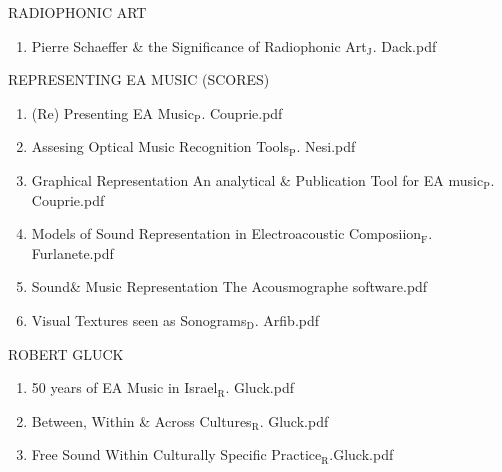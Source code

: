 \documentclass[11pt]{article}
\begin{document}
\item RADIOPHONIC ART
\label{sec-1-1-1-1-49-1-28}
\begin{enumerate}
\item Pierre Schaeffer \& the Significance of Radiophonic Art$_{\text{J}}$. Dack.pdf
\label{sec-1-1-1-1-49-1-28-1}
\end{enumerate}

\item REPRESENTING EA MUSIC (SCORES)
\label{sec-1-1-1-1-49-1-29}
\begin{enumerate}
\item (Re) Presenting EA Music$_{\text{P}}$. Couprie.pdf
\label{sec-1-1-1-1-49-1-29-1}

\item Assesing Optical Music Recognition Tools$_{\text{P}}$. Nesi.pdf
\label{sec-1-1-1-1-49-1-29-2}

\item Graphical Representation An analytical \& Publication Tool for EA music$_{\text{P}}$. Couprie.pdf
\label{sec-1-1-1-1-49-1-29-3}

\item Models of Sound Representation in Electroacoustic Composiion$_{\text{F}}$. Furlanete.pdf
\label{sec-1-1-1-1-49-1-29-4}

\item Sound\& Music Representation The Acousmographe software.pdf
\label{sec-1-1-1-1-49-1-29-5}

\item Visual Textures seen as Sonograms$_{\text{D}}$. Arfib.pdf
\label{sec-1-1-1-1-49-1-29-6}
\end{enumerate}

\item ROBERT GLUCK
\label{sec-1-1-1-1-49-1-30}
\begin{enumerate}
\item 50 years of EA Music in Israel$_{\text{R}}$. Gluck.pdf
\label{sec-1-1-1-1-49-1-30-1}

\item Between, Within \& Across Cultures$_{\text{R}}$. Gluck.pdf
\label{sec-1-1-1-1-49-1-30-2}

\item Free Sound Within Culturally Specific Practice$_{\text{R}}$.Gluck.pdf
\label{sec-1-1-1-1-49-1-30-3}
\end{enumerate}
\end{document}
